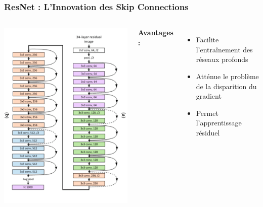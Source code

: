 \documentclass{beamer}
\begin{document}
\begin{frame}
    \frametitle{ResNet : L'Innovation des Skip Connections}
    \begin{columns}
        \includegraphics[width=\textwidth, angle=-90]{images/resnet.png}
        
        \textbf{Avantages :}
        \begin{itemize}
            \item Facilite l'entraînement des réseaux profonds
            \item Atténue le problème de la disparition du gradient
            \item Permet l'apprentissage résiduel
        \end{itemize}
    \end{columns}
\end{frame}
\end{document}
